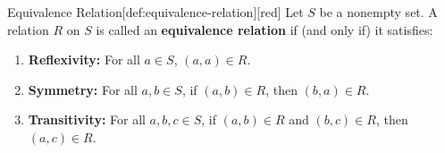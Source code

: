 \newpage
\begin{define}{Equivalence Relation}[def:equivalence-relation][red]
  Let \(S\) be a nonempty set.
  A relation \(R\) on \(S\) is called an \textbf{equivalence relation} if (and only if) it satisfies:
  \begin{enumerate}
    \item \textbf{Reflexivity:} For all \(a \in S\), \((a, a) \in R\).
    \item \textbf{Symmetry:} For all \(a, b \in S\), if \((a, b) \in R\), then \((b, a) \in R\).
    \item \textbf{Transitivity:} For all \(a, b, c \in S\), if \((a, b) \in R\) and \((b, c) \in R\), then \((a, c) \in R\).
  \end{enumerate}
\end{define}

